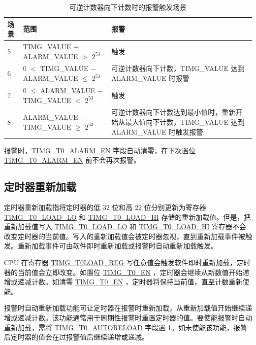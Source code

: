 \documentclass[main\_\_CN.tex]{subfiles}
\begin{document}
\begin{table}[H]
\centering
\caption{可逆计数器向下计数时的报警触发场景}
\label{tab:timg-alarm-generation-down}

\begin{tabular}{|l|l|m{7cm}|}
\hline
\rowcolor{lightgray}
    \textbf{场景} & \textbf{范围} & \textbf{报警} \\\hline
     5 & TIMG\_VALUE $-$ ALARM\_VALUE  $>$ $2^{53}$ & 触发 \\\hline
     6 &  0 $<$ TIMG\_VALUE $-$ ALARM\_VALUE $\leq$ $2^{53}$ & 可逆计数器向下计数，TIMG\_VALUE 达到 ALARM\_VALUE 时报警 \\\hline
     7 & 0 $\leq$ ALARM\_VALUE $-$ TIMG\_VALUE $<$ $2^{53}$ & 触发 \\\hline
     8 & ALARM\_VALUE $-$ TIMG\_VALUE $\geq$ $2^{53}$ & 可逆计数器向下计数达到最小值时，重新开始从最大值向下计数，TIMG\_VALUE 达到 ALARM\_VALUE 时触发报警 \\\hline

\end{tabular}
\end{table}

报警时，\hyperref[fielddesc:TIMGTXALARMEN]{TIMG\_T0\_ALARM\_EN} 字段自动清零，在下次置位 \hyperref[fielddesc:TIMGTXALARMEN]{TIMG\_T0\_ALARM\_EN} 前不会再次报警。

\subsection{定时器重新加载} \label{sec:timg-func-descr-reload}
定时器重新加载指将定时器的低 32 位和高 22 位分别更新为寄存器 \hyperref[fielddesc:TIMGTXLOADLO]{TIMG\_T0\_LOAD\_LO} 和 \hyperref[fielddesc:TIMGTXLOADHI]{TIMG\_T0\_LOAD\_HI} 存储的重新加载值。但是，把重新加载值写入 \hyperref[fielddesc:TIMGTXLOADLO]{TIMG\_T0\_LOAD\_LO} 和 \hyperref[fielddesc:TIMGTXLOADHI]{TIMG\_T0\_LOAD\_HI} 寄存器不会改变定时器的当前值。写入的重新加载值会被定时器忽视，直到重新加载事件被触发。重新加载事件可由软件即时重新加载或报警时自动重新加载触发。

CPU 在寄存器 \hyperref[regdesc:TIMGTXLOADREG]{TIMG\_T0LOAD\_REG} 写任意值会触发软件即时重新加载，定时器的当前值会立即改变。如置位 \hyperref[fielddesc:TIMGTXEN]{TIMG\_T0\_EN} ，定时器会继续从新数值开始递增或递减计数。如清零 \hyperref[fielddesc:TIMGTXEN]{TIMG\_T0\_EN} ，定时器将保持当前值，直至计数重新使能。

报警时自动重新加载功能可让定时器在报警时重新加载，从重新加载值开始继续递增或递减计数。该功能通常用于周期性报警时重置定时器的值。要使能报警时自动重新加载，需将 \hyperref[fielddesc:TIMGTXAUTORELOAD]{TIMG\_T0\_AUTORELOAD} 字段置 1。如未使能该功能，报警后定时器的值会在过报警值后继续递增或递减。
\end{document}
